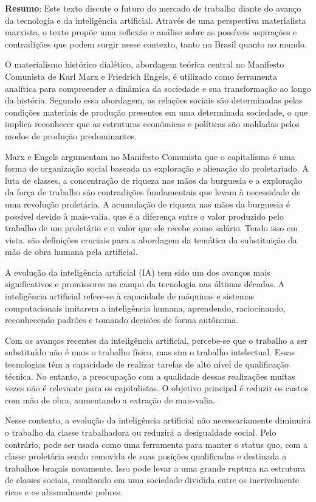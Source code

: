 \begin{titulo}
\raggedright\raggedright \textbf{Resumo}: 
Este texto discute o futuro do mercado de trabalho diante do avanço da tecnologia e da inteligência artificial. Através de uma perspectiva materialista marxista, o texto propõe uma reflexão e análise sobre as possíveis aspirações e contradições que podem surgir nesse contexto, tanto no Brasil quanto no mundo.
\par
O materialismo histórico dialético, abordagem teórica central no Manifesto Comunista de Karl Marx e Friedrich Engels, é utilizado como ferramenta analítica para compreender a dinâmica da sociedade e sua transformação ao longo da história. Segundo essa abordagem, as relações sociais são determinadas pelas condições materiais de produção presentes em uma determinada sociedade, o que implica reconhecer que as estruturas econômicas e políticas são moldadas pelos modos de produção predominantes.
\par
Marx e Engels argumentam no Manifesto Comunista que o capitalismo é uma forma de organização social baseada na exploração e alienação do proletariado. A luta de classes, a concentração de riqueza nas mãos da burguesia e a exploração da força de trabalho são contradições fundamentais que levam à necessidade de uma revolução proletária. A acumulação de riqueza nas mãos da burguesia é possível devido à mais-valia, que é a diferença entre o valor produzido pelo trabalho de um proletário e o valor que ele recebe como salário. Tendo isso em vista, são definições cruciais para a abordagem da temática da substituição da mão de obra humana pela artificial.
\par
A evolução da inteligência artificial (IA) tem sido um dos avanços mais significativos e promissores no campo da tecnologia nas últimas décadas. A inteligência artificial refere-se à capacidade de máquinas e sistemas computacionais imitarem a inteligência humana, aprendendo, raciocinando, reconhecendo padrões e tomando decisões de forma autônoma.
 \par
Com os avanços recentes da inteligência artificial, percebe-se que o trabalho a ser substituído não é mais o trabalho físico, mas sim o trabalho intelectual. Essas tecnologias têm a capacidade de realizar tarefas de alto nível de qualificação técnica. No entanto, a preocupação com a qualidade dessas realizações muitas vezes não é relevante para os capitalistas. O objetivo principal é reduzir os custos com mão de obra, aumentando a extração de mais-valia.
\par
Nesse contexto, a evolução da inteligência artificial não necessariamente diminuirá o trabalho da classe trabalhadora ou reduzirá a desigualdade social. Pelo contrário, pode ser usada como uma ferramenta para manter o status quo, com a classe proletária sendo removida de suas posições qualificadas e destinada a trabalhos braçais novamente. Isso pode levar a uma grande ruptura na estrutura de classes sociais, resultando em uma sociedade dividida entre os incrivelmente ricos e os abismalmente pobres.

\end{titulo}
